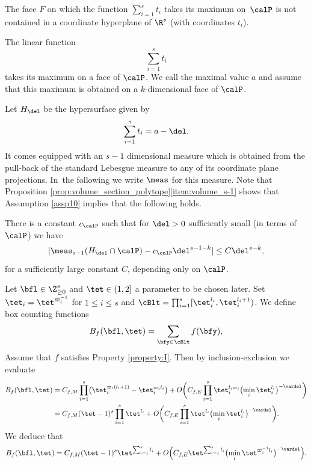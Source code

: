 \begin{assumption}\label{assp11}
The face $F$ on which the function $\sum_{i=1}^s t_i$ takes its maximum on~$\calP$ is not contained in a coordinate hyperplane of $\R^s$ (with coordinates $t_i$).
\end{assumption}

The linear function
\[
\sum_{i=1}^s t_i
\]
takes its maximum on a face of $\calP$. We call the maximal value $a$ and assume that this maximum is obtained on a $k$-dimensional face of $\calP$.\par

Let $H_{\del}$ be the hypersurface given by
\[
\sum_{i=1}^s t_i=a-\del.
\]
It comes equipped with an $s-1$ dimensional measure which is obtained from the pull-back of the standard Lebesgue measure to any of its coordinate plane projections. In~the following we write $\meas$ for this measure.
Note that Proposition \ref{prop:volume_section_polytope}\eqref{item:volume_s-1} shows that Assumption \ref{assp10} implies that the following holds.
\par\smallskip
There is a constant $c_{\calP}$ such that for $\del >0$ sufficiently small (in terms of $\calP$) we have
\begin{equation}\label{eqn65}
|\meas_{s-1} (H_{\del} \cap \calP)-c_{\calP}\del^{s-1-k}|\leq C\del^{s-k},
\end{equation}
for a sufficiently large constant $C$, depending only on $\calP$.
\par\smallskip
Let $\bfl\in \Z_{\geq 0}^s$ and $\tet\in(1,2]$ a parameter to be chosen later. Set $\tet_i=\tet^{\varpi_i^{-1}}$ for $1\leq i\leq s$ and $\cBlt=\prod_{i=1}^s[\tet_i^{l_i},\tet_i^{l_i+1})$. We define box counting functions
\[
B_f(\bfl,\tet)= \sum_{\bfy\in\cBlt} f(\bfy),
\]
Assume that $f$ satisfies Property \ref{property:I}. Then by inclusion-exclusion we evaluate
\begin{equation*}
\begin{split}
B_f(\bfl,\tet)&= C_{f,M} \prod_{i=1}^s \bigl(\tet_i^{\varpi_i (l_i+1)} - \tet_i^{\varpi_i l_i}\bigr)+O\biggl(C_{f,E} \prod_{i=1}^s \tet_i^{l_i\varpi_i} \bigl(\min_i \tet_i^{l_i}\bigr)^{-\vardel}\biggr)\\
&= C_{f,M} (\tet-1)^s \prod_{i=1}^s \tet^{l_i}+O\biggl(C_{f,E} \prod_{i=1}^s \tet^{l_i} \bigl(\min_i \tet_i^{l_i}\bigr)^{-\vardel}\biggr).
\end{split}
\end{equation*}
We deduce that
\begin{gather*}
B_f(\bfl,\tet)= C_{f,M} (\tet-1)^s \tet^{\sum_{i=1}^s l_i}+O\Bigl(C_{f,E} \tet^{\sum_{i=1}^s l_i} \bigl(\min_i \tet^{\varpi_i^{-1}l_i}\bigr)^{-\vardel}\Bigr).
\end{gather*}

